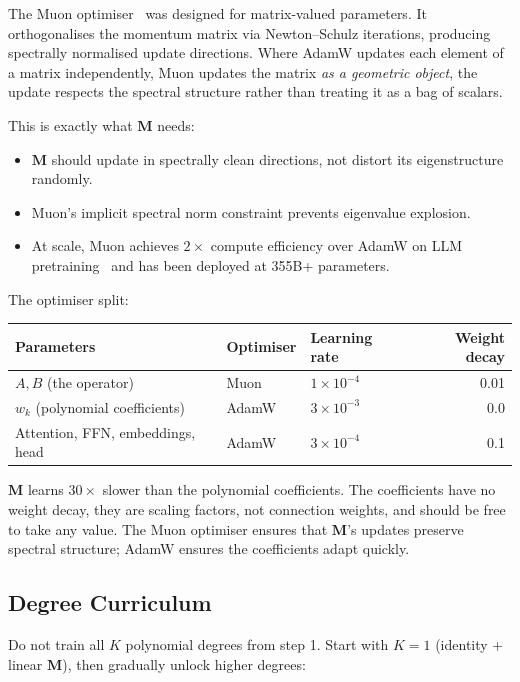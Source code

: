 \documentclass[11pt, a4paper]{article}
\newcommand{\M}{\mathbf{M}}
\theoremstyle{plain}
\theoremstyle{definition}
\theoremstyle{remark}
\begin{document}
The Muon optimiser~\cite{jordan2024muon} was designed for matrix-valued parameters.
It orthogonalises the momentum matrix via Newton--Schulz iterations, producing spectrally normalised update directions.
Where AdamW updates each element of a matrix independently, Muon updates the matrix \emph{as a geometric object}, the update respects the spectral structure rather than treating it as a bag of scalars.

This is exactly what $\M$ needs:
\begin{itemize}[nosep]
\item $\M$ should update in spectrally clean directions, not distort its eigenstructure randomly.
\item Muon's implicit spectral norm constraint prevents eigenvalue explosion.
\item At scale, Muon achieves $2\times$ compute efficiency over AdamW on LLM pretraining~\cite{liu2025muon} and has been deployed at 355B+ parameters.
\end{itemize}

The optimiser split:
\begin{center}\small
\begin{tabular}{lllr}
\toprule
\textbf{Parameters} & \textbf{Optimiser} & \textbf{Learning rate} & \textbf{Weight decay} \\
\midrule
$A, B$ (the operator) & Muon & $1 \times 10^{-4}$ & 0.01 \\
$w_k$ (polynomial coefficients) & AdamW & $3 \times 10^{-3}$ & 0.0 \\
Attention, FFN, embeddings, head & AdamW & $3 \times 10^{-4}$ & 0.1 \\
\bottomrule
\end{tabular}
\end{center}

$\M$ learns $30\times$ slower than the polynomial coefficients.
The coefficients have no weight decay, they are scaling factors, not connection weights, and should be free to take any value.
The Muon optimiser ensures that $\M$'s updates preserve spectral structure; AdamW ensures the coefficients adapt quickly.

\subsection{Degree Curriculum}

Do not train all $K$ polynomial degrees from step 1.
Start with $K = 1$ (identity + linear $\M$), then gradually unlock higher degrees:
\end{document}
